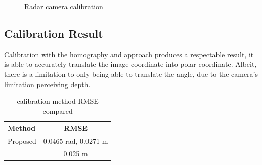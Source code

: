 \begin{figure}[hbpt]
    \caption{Radar camera calibration}
    \label{fig:radar_camera_calibration}
\end{figure}


\newpage
\subsection{Calibration Result}\label{subsec:2-3-calibration-result}
Calibration with the homography and approach produces a respectable result, 
it is able to accurately translate the image coordinate into polar coordinate.
Albeit, there is a limitation to only being able to translate the angle, due to the camera's limitation perceiving depth.
\begin{table}[h!]
    \begin{center}
      \label{tab:table4}
      \begin{tabular}{l|c} %
        \textbf{Method} & \textbf{RMSE} \\%
        \hline
        Proposed                            & 0.0465 rad, 0.0271 m \\%
        \citeauthor{8794186}\cite{8794186}  & 0.025 m \\%
      \end{tabular}
    \end{center}
    \caption{calibration method RMSE compared}
    \label{tab:callib_rmse}
  \end{table}

